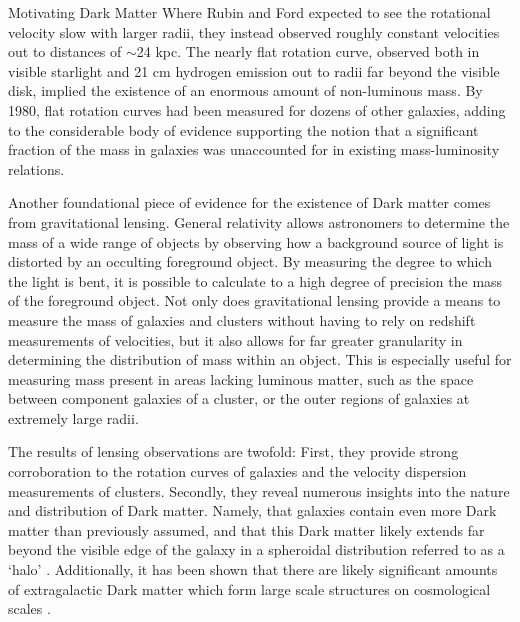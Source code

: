 \documentclass[a4paper,11pt]{article}
\begin{document}
\begin{section}{Motivating Dark Matter}
    Where Rubin and Ford expected to see the rotational velocity slow with larger radii, they instead observed roughly constant velocities out to distances of $\sim$24 kpc.
    The nearly flat rotation curve, observed both in visible starlight and 21 cm hydrogen emission out to radii far beyond the visible disk, implied the existence of an enormous amount of non-luminous mass. 
    By 1980, flat rotation curves had been measured for dozens of other galaxies, adding to the considerable body of evidence supporting the notion that a significant fraction of the mass in galaxies was unaccounted for in existing mass-luminosity relations.

    Another foundational piece of evidence for the existence of Dark matter comes from gravitational lensing.
    General relativity allows astronomers to determine the mass of a wide range of objects by observing how a background source of light is distorted by an occulting foreground object. By measuring the degree to which the light is bent, it is possible to calculate to a high degree of precision the mass of the foreground object.
    Not only does gravitational lensing provide a means to measure the mass of galaxies and clusters without having to rely on redshift measurements of velocities, but it also allows for far greater granularity in determining the distribution of mass within an object.
    This is especially useful for measuring mass present in areas lacking luminous matter, such as the space between component galaxies of a cluster, or the outer regions of galaxies at extremely large radii.

    The results of lensing observations are twofold:
    First, they provide strong corroboration to the rotation curves of galaxies and the velocity dispersion measurements of clusters.
    Secondly, they reveal numerous insights into the nature and distribution of Dark matter.
    Namely, that galaxies contain even more Dark matter than previously assumed, and that this Dark matter likely extends far beyond the visible edge of the galaxy in a spheroidal distribution referred to as a `halo' \cite{Freese:2017dm}.
    Additionally, it has been shown that there are likely significant amounts of extragalactic Dark matter which form large scale structures on cosmological scales \cite{Freese:2017dm}.


\end{section}
\end{document}

